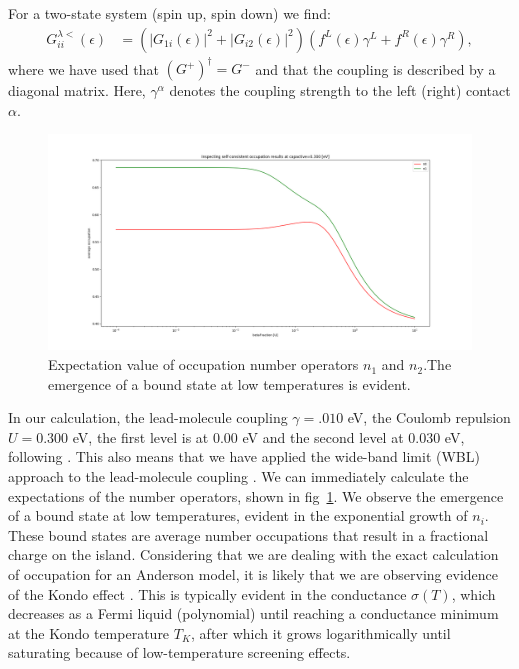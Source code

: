 \documentclass{article}
\begin{document}
\begin{multicols}{2}
        For a two-state system (spin up, spin down) we find:
        \begin{align*}
            G^{\lambda<}_{ii}(\epsilon) &= \left(\left|G_{1i}(\epsilon)\right|^2 + \left|G_{i2}(\epsilon)\right|^2 \right)\left(f^L (\epsilon) \gamma^L+f^R (\epsilon) \gamma^R\right),
        \end{align*}
        where we have used that $(G^+)^\dagger=G^-$ and that the coupling is described by a diagonal matrix. Here, $\gamma^\alpha$ denotes the coupling strength to the left (right) contact $\alpha$.
        
        \begin{figure}[b]
            \centering
            \includegraphics[width=\textwidth]{fig/figure_1.png}
            \caption{\label{fig:numberoperators}Expectation value of occupation number operators $n_1$ and $n_2$.The emergence of a bound state at low temperatures is evident.}
        \end{figure}
          
        In our calculation, the lead-molecule coupling $\gamma=.010$ eV, the Coulomb repulsion $U=0.300$ eV, the first level is at $0.00$ eV and the second level at $0.030$ eV, following \citet{meir}. This also means that we have applied the wide-band limit (WBL) approach to the lead-molecule coupling \cite{diventra, Datta1997, haugjauho, Mattuck1976, perrinnano}. We can immediately calculate the expectations of the number operators, shown in fig~\ref{fig:numberoperators}. We observe the emergence of a bound state at low temperatures, evident in the exponential growth of $n_i$. These bound states are average number occupations that result in a fractional charge on the island. Considering that we are dealing with the exact calculation of occupation for an Anderson model, it is likely that we are observing evidence of the Kondo effect \cite{josherrereview}. This is typically evident in the conductance $\sigma(T)$, which decreases as a Fermi liquid (polynomial) until reaching a conductance minimum at the Kondo temperature $T_K$, after which it grows logarithmically until saturating because of low-temperature screening effects.
        

\end{multicols}
\end{document}

